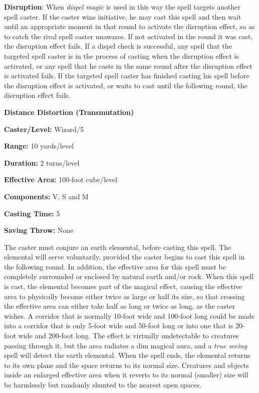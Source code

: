 \begin{multicols}{2}
\textbf{Disruption}: When \textit{dispel magic} is used in this way the spell targets another spell caster.  If the caster wins initiative, he may cast this spell and then wait until an appropriate moment in that round to activate the disruption effect, so as to catch the rival spell caster unawares.  If not activated in the round it was cast, the disruption effect fails.  If a dispel check is successful, any spell that the targeted spell caster is in the process of casting when the disruption effect is activated, or any spell that he casts in the same round after the disruption effect is activated fails.  If the targeted spell caster has finished casting his spell before the disruption effect is activated, or waits to cast until the following round, the disruption effect fails.


\vspace{1em}

\noindent
\begin{minipage}{\columnwidth}

\noindent \textbf{Distance Distortion (Transmutation)}

\noindent \textbf{Caster/Level:} Wizard/5

\noindent \textbf{Range:} 10 yards/level

\noindent \textbf{Duration:} 2 turns/level

\noindent \textbf{Effective Area:} 100-foot cube/level

\noindent \textbf{Components:} V, S and M

\noindent \textbf{Casting Time:} 5

\noindent \textbf{Saving Throw:} None

\end{minipage}

The caster must conjure an earth elemental, before casting this spell.  The elemental will serve voluntarily, provided the caster begins to cast this spell in the following round.  In addition, the effective area for this spell must be completely surrounded or enclosed by natural earth and/or rock.  When this spell is cast, the elemental becomes part of the magical effect, causing the effective area to physically become either twice as large or half its size, so that crossing the effective area can either take half as long or twice as long, as the caster wishes.  A corridor that is normally 10-foot wide and 100-foot long could be made into a corridor that is only 5-foot wide and 50-foot long or into one that is 20-foot wide and 200-foot long.  The effect is virtually undetectable to creatures passing through it, but the area radiates a dim magical aura, and a \textit{true seeing} spell will detect the earth elemental.  When the spell ends, the elemental returns to its own plane and the space returns to its normal size.  Creatures and objects inside an enlarged effective area when it reverts to its normal (smaller) size will be harmlessly but randomly shunted to the nearest open spaces.


\end{multicols}
